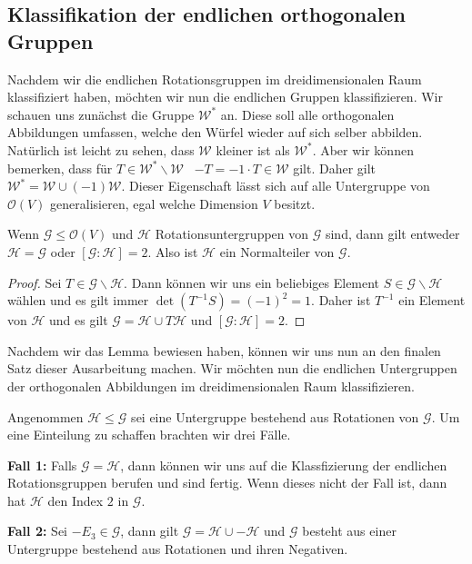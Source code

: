 \subsection{Klassifikation der endlichen orthogonalen Gruppen}
Nachdem wir die endlichen Rotationsgruppen im dreidimensionalen Raum klassifiziert haben, möchten wir nun die endlichen Gruppen klassifizieren. Wir schauen uns zunächst die Gruppe $\mathcal{W}^*$ an. Diese soll alle orthogonalen Abbildungen umfassen, welche den Würfel wieder auf sich selber abbilden. Natürlich ist leicht zu sehen, dass $\mathcal{W}$ kleiner ist als $\mathcal{W}^*$. Aber wir können bemerken, dass für $T \in \mathcal{W}^*\backslash\mathcal{W}$ \ $-T = -1 \cdot T \in \mathcal{W}$ gilt. Daher gilt $\mathcal{W}^*=\mathcal{W}\cup(-1)\mathcal{W}$.
Dieser Eigenschaft lässt sich auf alle Untergruppe von $\mathcal{O}(V)$ generalisieren, egal welche Dimension $V$ besitzt.

\begin{lemma}
    Wenn $\mathcal{G} \leq \mathcal{O}(V)$ und $\mathcal{H}$ Rotationsuntergruppen von $\mathcal{G}$ sind, dann gilt entweder $\mathcal{H}=\mathcal{G}$ oder $[\mathcal{G}:\mathcal{H}] = 2$. Also ist $\mathcal{H}$ ein Normalteiler von $\mathcal{G}$.
\end{lemma}
\begin{proof}
    Sei $T \in \mathcal{G}\backslash\mathcal{H}$. Dann können wir uns ein beliebiges Element $S\in\mathcal{G}\backslash\mathcal{H}$ wählen und es gilt immer $\det(T^{-1}S) = (-1)^2=1$. Daher ist $T^{-1}$ ein Element von $\mathcal{H}$ und es gilt $\mathcal{G} = \mathcal{H} \cup T\mathcal{H}$ und $[\mathcal{G}:\mathcal{H}]=2$.
\end{proof}
Nachdem wir das Lemma bewiesen haben, können wir uns nun an den finalen Satz dieser Ausarbeitung machen. Wir möchten nun die endlichen Untergruppen der orthogonalen Abbildungen im dreidimensionalen Raum klassifizieren.

Angenommen $\mathcal{H} \leq \mathcal{G}$ sei eine Untergruppe bestehend aus Rotationen von $\mathcal{G}$. Um eine Einteilung zu schaffen brachten wir drei Fälle.
 
 
 \textbf{Fall 1:} Falls $\mathcal{G} = \mathcal{H}$, dann können wir uns auf die Klassfizierung der endlichen Rotationsgruppen berufen und sind fertig. Wenn dieses nicht der Fall ist, dann hat $\mathcal{H}$ den Index $2$ in $\mathcal{G}$.
 
 
 \textbf{Fall 2:} Sei $-E_3 \in \mathcal{G}$, dann gilt $\mathcal{G} = \mathcal{H} \cup - \mathcal{H}$ und $\mathcal{G}$ besteht aus einer Untergruppe bestehend aus Rotationen und ihren Negativen.


